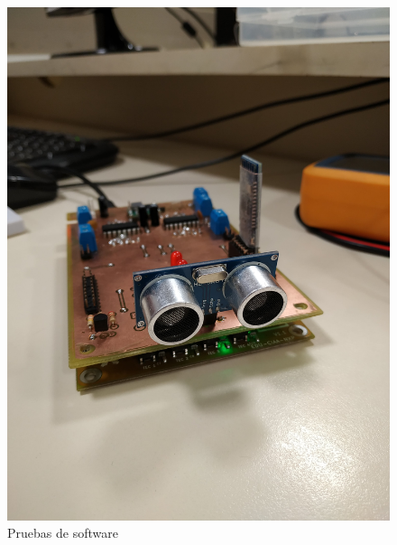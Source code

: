 \begin{figure}[H]
	\centering
	\includegraphics[width=0.9\linewidth]{imagenes/pruebas_software.jpg}
	\caption{Pruebas de software}
	\label{fig:prueba-software}
\end{figure}

